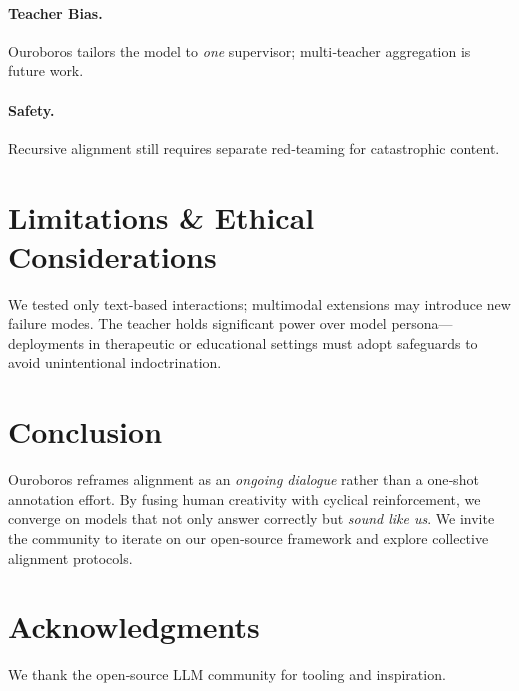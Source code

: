 \documentclass[11pt]{article}
\begin{document}
\paragraph{Teacher Bias.} Ouroboros tailors the model to \emph{one} supervisor; multi‑teacher aggregation is future work.%
\paragraph{Safety.} Recursive alignment still requires separate red‑teaming for catastrophic content.

\section{Limitations \& Ethical Considerations}
We tested only text‑based interactions; multimodal extensions may introduce new failure modes.  The teacher holds significant power over model persona---deployments in therapeutic or educational settings must adopt safeguards to avoid unintentional indoctrination.

\section{Conclusion}
Ouroboros reframes alignment as an \emph{ongoing dialogue} rather than a one‑shot annotation effort.  By fusing human creativity with cyclical reinforcement, we converge on models that not only answer correctly but \emph{sound like us}.  We invite the community to iterate on our open‑source framework and explore collective alignment protocols.

\section*{Acknowledgments}
We thank the open‑source LLM community for tooling and inspiration.
\end{document}
